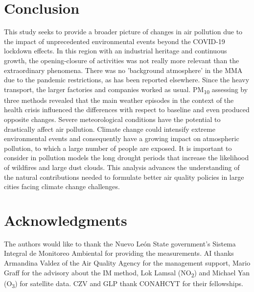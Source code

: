 \documentclass[sn-mathphys-num,iicol]{sn-jnl}
\begin{document}
\section{Conclusion}
This study seeks to provide a broader picture of changes in air pollution due to the impact of unprecedented environmental events beyond the COVID-19 lockdown effects. In this region with an industrial heritage and continuous growth, the opening-closure of activities was not really more relevant than the extraordinary phenomena. There was no 'background atmosphere' in the MMA due to the pandemic restrictions, as has been reported elsewhere. Since the heavy transport, the larger factories and companies worked as usual. PM\textsubscript{10} assessing by three methods revealed that the main weather episodes in the context of the health crisis influenced the differences with respect to baseline and even produced opposite changes. Severe meteorological conditions have the potential to drastically affect air pollution. Climate change could intensify extreme environmental events and consequently have a growing impact on atmospheric pollution, to which a large number of people are exposed. It is important to consider in pollution models the long drought periods that increase the likelihood of wildfires and large dust clouds. This analysis advances the understanding of the natural contributions needed to formulate better air quality policies in large cities facing climate change challenges.
\section{Acknowledgments}
The authors would like to thank the Nuevo León State government’s Sistema Integral de Monitoreo Ambiental for providing the measurements. AI thanks Armandina Valdez of the Air Quality Agency for the management support, Mario Graff for the advisory about the IM method, Lok Lamsal (NO\textsubscript{2}) and Michael Yan (O\textsubscript{3}) for satellite data. CZV and GLP thank CONAHCYT for their fellowships.

\end{document}
